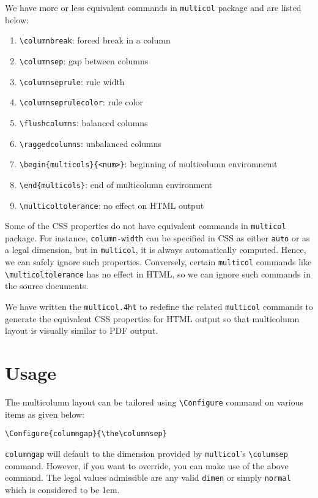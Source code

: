 \documentclass{article}
\begin{document}
We have more or less equivalent commands in \texttt{multicol} package and
are listed below:

\begin{enumerate}
\item \texttt{\textbackslash{}columnbreak}: forced break in a column
\item \texttt{\textbackslash{}columnsep}: gap between columns
\item \texttt{\textbackslash{}columnseprule}: rule width
\item \texttt{\textbackslash{}columnseprulecolor}: rule color
\item \texttt{\textbackslash{}flushcolumns}: balanced columns
\item \texttt{\textbackslash{}raggedcolumns}: unbalanced columns
\item \texttt{\textbackslash{}begin\{multicols\}\{<num>\}}: beginning of multicolumn enviromnemt
\item \texttt{\textbackslash{}end\{multicols\}}: end of multicolumn environment
\item \texttt{\textbackslash{}multicoltolerance}: no effect on HTML output
\end{enumerate}

Some of the CSS properties do not have equivalent commands in
\texttt{multicol} package. For instance, \texttt{column-width} can be
specified in CSS as either \texttt{auto} or as a legal dimension, but
in \texttt{multicol}, it is always automatically computed. Hence, we
can safely ignore such properties. Conversely, certain
\texttt{multicol} commands like
\texttt{\textbackslash{}multicoltolerance} has no effect in HTML, so
we can ignore such commands in the source documents.

We have written the \texttt{multicol.4ht} to redefine the related
\texttt{multicol} commands to generate the equivalent CSS properties
for HTML output so that multicolumn layout is visually similar to PDF
output.

\section*{Usage}
\label{sec-3}

The multicolumn layout can be tailored using
\texttt{\textbackslash{}Configure} command on various items as given
below:

\begin{verbatim}
\Configure{columngap}{\the\columnsep}
\end{verbatim}
\texttt{columngap} will default to the dimension provided by
\texttt{multicol}'s \texttt{\textbackslash{}columsep}
command. However, if you want to override, you can make use of the
above command. The legal values admissible are any valid
\texttt{dimen} or simply \texttt{normal} which is considered to be
1em.
\end{document}
